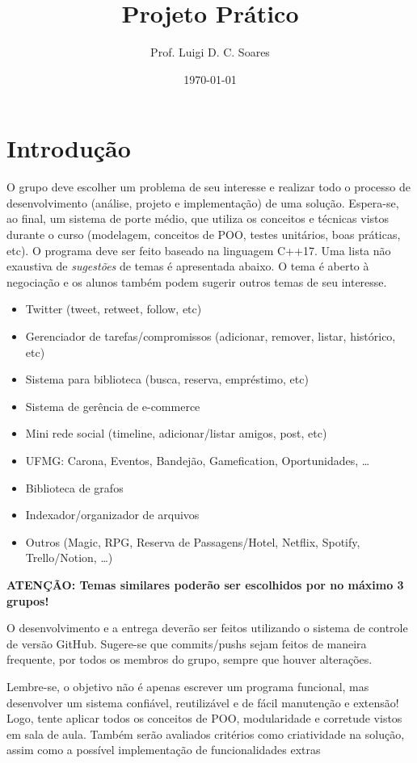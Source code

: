 \documentclass[11pt]{article}
\author{Prof. Luigi D. C. Soares}
\date{\today}
\title{Projeto Prático}
\begin{document}
\begin{center}
    \Large\bfseries\thetitle{}
\end{center}

\section{Introdução}
\label{sec:orgb5aeea8}

O grupo deve escolher um problema de seu interesse e realizar todo o
processo de desenvolvimento (análise, projeto e implementação) de uma
solução. Espera-se, ao final, um sistema de porte médio, que utiliza
os conceitos e técnicas vistos durante o curso (modelagem, conceitos
de POO, testes unitários, boas práticas, etc). O programa deve ser
feito baseado na linguagem C++17. Uma lista não exaustiva de \emph{sugestões}
de temas é apresentada abaixo. O tema é aberto à negociação e os
alunos também podem sugerir outros temas de seu interesse.

\begin{itemize}
\item Twitter (tweet, retweet, follow, etc)
\item Gerenciador de tarefas/compromissos (adicionar, remover, listar, histórico, etc)
\item Sistema para biblioteca (busca, reserva, empréstimo, etc)
\item Sistema de gerência de e-commerce
\item Mini rede social (timeline, adicionar/listar amigos, post, etc)
\item UFMG: Carona, Eventos, Bandejão, Gamefication, Oportunidades, \ldots{}
\item Biblioteca de grafos
\item Indexador/organizador de arquivos
\item Outros (Magic, RPG, Reserva de Passagens/Hotel, Netflix, Spotify, Trello/Notion, \ldots{})
\end{itemize}

\textbf{ATENÇÃO: Temas similares poderão ser escolhidos por no máximo 3 grupos!}

O desenvolvimento e a entrega deverão ser feitos utilizando o sistema
de controle de versão GitHub. Sugere-se que commits/pushs sejam feitos
de maneira frequente, por todos os membros do grupo, sempre que houver
alterações.

Lembre-se, o objetivo não é apenas escrever um programa funcional, mas
desenvolver um sistema confiável, reutilizável e de fácil manutenção e
extensão! Logo, tente aplicar todos os conceitos de POO, modularidade
e corretude vistos em sala de aula. Também serão avaliados critérios
como criatividade na solução, assim como a possível implementação de
funcionalidades extras
\end{document}
